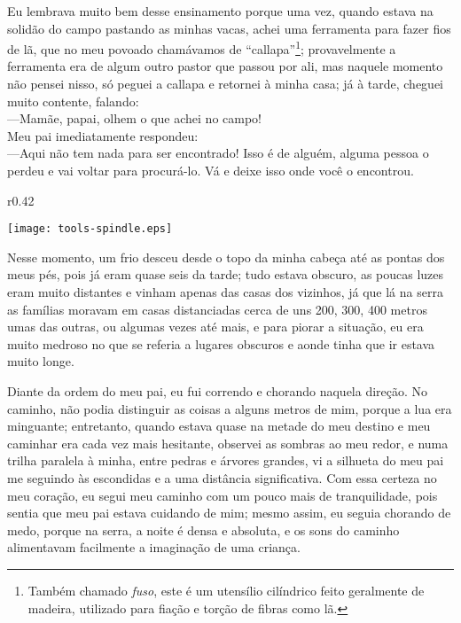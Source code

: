 Eu lembrava muito bem desse ensinamento porque uma vez, quando estava na solidão do campo pastando as minhas vacas, achei uma ferramenta para fazer fios de lã, que no meu povoado chamávamos de ``callapa''\footnote{Também chamado \textit{fuso}, este é um utensílio cilíndrico feito geralmente de madeira, utilizado para fiação e torção de fibras como lã.}; provavelmente a ferramenta era de algum outro pastor que passou por ali, mas naquele momento não pensei nisso, só peguei a callapa e retornei à minha casa; já à tarde, cheguei  muito contente, falando:\\\indent
---Mamãe, papai, olhem o que achei no campo!\\\indent
Meu pai imediatamente respondeu:\\\indent
---Aqui não tem nada para ser encontrado! Isso é de alguém, alguma pessoa o perdeu e vai voltar para procurá-lo. 
Vá e deixe isso onde você o encontrou.

\ifdefined\EnableIncludeImages
\begin{wrapfigure}{r}{0.42\textwidth}
  \begin{center}
  \vspace{-10pt}
    \texttt{[image: tools-spindle.eps]}
  \end{center}
  \vspace{-20pt}
\end{wrapfigure}
\fi
Nesse momento, um frio desceu desde o topo da minha cabeça até as pontas dos meus pés, pois já eram quase seis da tarde; tudo estava obscuro, as poucas luzes eram muito distantes e vinham apenas das casas dos vizinhos, já que lá na serra as famílias moravam em casas distanciadas cerca de uns 200, 300, 400 metros umas das outras, ou algumas vezes até mais, e para piorar a situação, eu era muito medroso no que se referia a lugares obscuros e aonde tinha que ir estava muito longe.

Diante da ordem do meu pai, eu fui correndo e chorando naquela direção. 
No caminho, não podia distinguir as coisas a alguns metros de mim, porque a lua era minguante; 
entretanto, quando estava quase na metade do meu destino e meu caminhar era cada vez mais hesitante, observei as sombras ao meu redor, e numa trilha paralela à minha, entre pedras e árvores grandes, vi a silhueta do meu pai me seguindo às escondidas e a uma distância significativa.
Com essa certeza no meu coração, eu segui meu caminho com um pouco mais de tranquilidade, pois sentia que meu pai estava cuidando de mim; 
mesmo assim, eu seguia chorando de medo, porque na serra, a noite é densa e absoluta, e os sons do caminho alimentavam facilmente a imaginação de uma criança.

